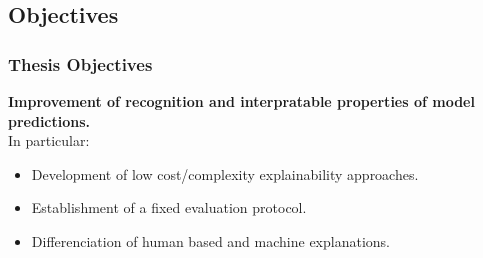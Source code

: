 \subsection*{Objectives}
\begin{frame}[t]
    \frametitle{Thesis Objectives}
    \textbf{Improvement of recognition and interpratable properties of model predictions.}\\
    \vspace{20pt}
    \pause    
    In particular:
    \begin{itemize}
        \item Development of low cost/complexity explainability approaches.
        \item Establishment of a fixed evaluation protocol. 
        \item Differenciation of human based and machine explanations.
    \end{itemize}

\end{frame}